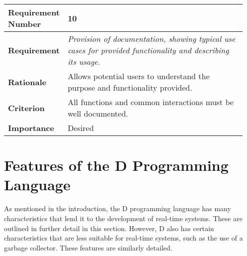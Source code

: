 \begin{table}[!h]
\centering
\begin{tabular}{|L{0.2\linewidth}|L{0.75\linewidth}|}
\hline
\textbf{Requirement Number} & 10 \\ \hline
\textbf{Requirement} & \emph{Provision of documentation, showing typical use cases for provided 
                functionality and describing its usage.} \\ \hline
\textbf{Rationale}      & Allows potential users to understand the purpose and 
                functionality provided. \\ \hline
\textbf{Criterion}      & All functions and common interactions must be well documented. \\ \hline
\textbf{Importance}     & Desired \\ \hline
\end{tabular}
\end{table}
\FloatBarrier
\section{Features of the D Programming Language}
As mentioned in the introduction, the D programming language has many 
characteristics that lend it to the development of real-time systems.
These are outlined in further detail in this section. 
However, D also has certain characteristics that are less suitable for 
real-time systems, such as the use of a garbage collector. 
These features are similarly detailed.

